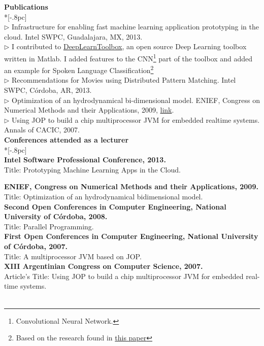 \documentclass[letter,11pt,english]{article}
\begin{document}
{\bf Publications} \\*[-.8pc]
\underline{\hspace{6in}} \\
$\triangleright$ Infrastructure for enabling fast machine learning application prototyping in the cloud. Intel SWPC, Guadalajara, MX, 2013.\\
$\triangleright$ I contributed to \href{https://github.com/rasmusbergpalm/DeepLearnToolbox} {DeepLearnToolbox},
an open source Deep Learning toolbox written in Matlab. I added features to the CNN\footnote{Convolutional Neural Network.}
part of the toolbox and added an example for Spoken Language Classification\footnote{Based on the research found in
\href{http://research.microsoft.com/en-us/um/people/dongyu/nips2009/papers/montavon-paper.pdf} {this paper}} \\
$\triangleright$ Recommendations for Movies using Distributed Pattern Matching. Intel SWPC, C\'ordoba, AR, 2013.\\
$\triangleright$ Optimization of an hydrodynamical bi-dimensional model. ENIEF, Congress on Numerical Methods 
and their Applications, 2009, \href{http://www.cimec.org.ar/ojs/index.php/mc/article/viewFile/2930/2867}{link}. \\
$\triangleright$ Using JOP to build a chip multiprocessor JVM for embedded realtime systems. Annals of CACIC, 2007.\\


{\large \bf Conferences attended as a lecturer} \\*[-.8pc]
\underline{\hspace{6in}} \\
{\bf  Intel Software Professional Conference, 2013.}\\
Title: Prototyping Machine Learning Apps in the Cloud. 

{\bf  ENIEF, Congress on Numerical Methods and their Applications, 2009.}\\
Title: Optimization of an hydrodynamical bidimensional model. 
\\
{\bf  Second Open Conferences in Computer Engineering, National University of C\'ordoba, 2008.}\\
Title: Parallel Programming.
\\
{\bf  First Open Conferences in Computer Engineering, National University of C\'ordoba, 2007.}\\
Title: A multiprocessor JVM based on JOP.
\\
{{\bf  XIII Argentinian Congress on Computer Science, 2007.}\\
Article's Title: Using JOP to build a chip multiprocessor JVM for embedded real-time systems.}\\
\\
\end{document}
